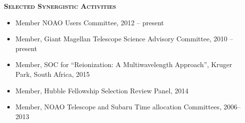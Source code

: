 \documentclass[11pt]{article}
\begin{document}
\begin{flushleft}
\vspace{-0.1in}
{\large {\bf \textsc{Selected Synergistic Activities}}
\hrulefill}
\end{flushleft}

\begin{itemize}
  \vspace{-0.08in}
\item Member NOAO Users Committee, 2012 -- present
  \vspace{-0.08in}

\item Member, Giant Magellan Telescope Science Advisory Committee,
  2010 -- present
  \vspace{-0.08in}

\item Member, SOC for ``Reionization: A Multiwavelength Approach'',
  Kruger Park, South Africa,  2015
  \vspace{-0.08in}

\item Member, Hubble Fellowship Selection Review Panel, 2014
\vspace{-0.08in}

\item Member, NOAO Telescope and Subaru Time allocation Committees, 2006--2013
\vspace{-0.08in}

\end{itemize}
\end{document}
